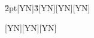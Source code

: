 \documentclass{article}
\begin{document}
\pgfmathsetmacro\u{2pt}[\ifpgfmathunitsdeclared Y\else N\fi]\pgfmathparse{2pt}\pgfmathsetmacro\v{3}[\ifpgfmathunitsdeclared Y\else N\fi]\pgfmathsetlength\myl{2pt}[\ifpgfmathunitsdeclared Y\else N\fi]\pgfmathparse{2pt}\pgfmathsetlength{}[\ifpgfmathunitsdeclared Y\else N\fi]

[\ifpgfmathunitsdeclared Y\else N\fi][\ifpgfmathunitsdeclared Y\else N\fi][\ifpgfmathunitsdeclared Y\else N\fi]
\end{document}
